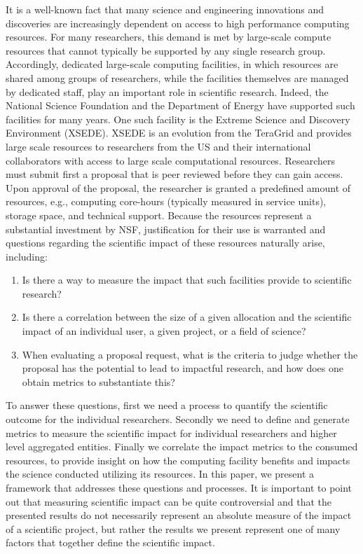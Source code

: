 \documentclass{sig-alternate}
\begin{document}
It is a well-known fact that many science and engineering innovations and discoveries are increasingly dependent on access to high performance computing resources. For many researchers, this demand is met by large-scale compute resources that cannot typically be supported by any single research group. Accordingly, dedicated large-scale computing facilities, in which resources are shared among groups of researchers, while the facilities themselves are managed by dedicated staff, play an important role in scientific research. Indeed, the National Science Foundation and the Department of Energy have supported such facilities for many years. One such facility is the Extreme Science and Discovery Environment (XSEDE). XSEDE is an evolution from the TeraGrid \cite{www-xsede} and provides large scale resources to researchers from the US and their international collaborators with access to large scale computational resources. Researchers must submit first a proposal that is peer reviewed before they can gain access. Upon approval of the proposal, the researcher is granted a predefined amount of resources, e.g., computing core-hours (typically measured in service units), storage space, and technical support. Because the resources represent a substantial investment by NSF, justification for their use is warranted and questions regarding the scientific impact of these resources naturally arise, including:

\begin{enumerate} 
\item Is there a way to measure the impact that such facilities provide to scientific research?

\item Is there a correlation between the size of a given allocation and the scientific impact of an individual user, a given project, or a field of science?  
 
\item When evaluating a proposal request, what is the criteria to judge whether the proposal has the potential to lead to impactful research, and how does one obtain metrics to substantiate this? 
\end{enumerate} 

To answer these questions, first we need a process to quantify the scientific outcome for the individual researchers. Secondly we need to define and generate metrics to measure the scientific impact for individual researchers and higher level aggregated entities. Finally we correlate the impact metrics to the consumed resources, to provide insight on how the computing facility benefits and impacts the science conducted utilizing its resources. In this paper, we present a framework that addresses these questions and processes. It is important to point out that measuring scientific impact can be quite controversial and that the presented results do not necessarily represent an absolute measure of the impact of a scientific project, but rather the results we present represent one of many factors that together define the scientific impact.
\end{document}

